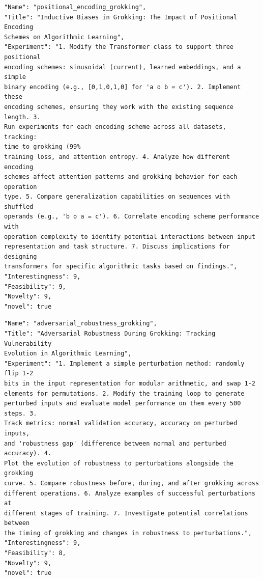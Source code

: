 \begin{tcolorbox}[breakable,colback=blue!5!white, colframe=blue!75!black, title=Idea 17/50 - \texttt{positional\_encoding\_grokking}]
\small
\begin{verbatim}
"Name": "positional_encoding_grokking",
"Title": "Inductive Biases in Grokking: The Impact of Positional Encoding
Schemes on Algorithmic Learning",
"Experiment": "1. Modify the Transformer class to support three positional
encoding schemes: sinusoidal (current), learned embeddings, and a simple
binary encoding (e.g., [0,1,0,1,0] for 'a o b = c'). 2. Implement these
encoding schemes, ensuring they work with the existing sequence length. 3.
Run experiments for each encoding scheme across all datasets, tracking:
time to grokking (99%
training loss, and attention entropy. 4. Analyze how different encoding
schemes affect attention patterns and grokking behavior for each operation
type. 5. Compare generalization capabilities on sequences with shuffled
operands (e.g., 'b o a = c'). 6. Correlate encoding scheme performance with
operation complexity to identify potential interactions between input
representation and task structure. 7. Discuss implications for designing
transformers for specific algorithmic tasks based on findings.",
"Interestingness": 9,
"Feasibility": 9,
"Novelty": 9,
"novel": true
\end{verbatim}
\end{tcolorbox}

\begin{tcolorbox}[breakable,colback=blue!5!white, colframe=blue!75!black, title=Idea 18/50 - \texttt{adversarial\_robustness\_grokking}]
\small
\begin{verbatim}
"Name": "adversarial_robustness_grokking",
"Title": "Adversarial Robustness During Grokking: Tracking Vulnerability
Evolution in Algorithmic Learning",
"Experiment": "1. Implement a simple perturbation method: randomly flip 1-2
bits in the input representation for modular arithmetic, and swap 1-2
elements for permutations. 2. Modify the training loop to generate
perturbed inputs and evaluate model performance on them every 500 steps. 3.
Track metrics: normal validation accuracy, accuracy on perturbed inputs,
and 'robustness gap' (difference between normal and perturbed accuracy). 4.
Plot the evolution of robustness to perturbations alongside the grokking
curve. 5. Compare robustness before, during, and after grokking across
different operations. 6. Analyze examples of successful perturbations at
different stages of training. 7. Investigate potential correlations between
the timing of grokking and changes in robustness to perturbations.",
"Interestingness": 9,
"Feasibility": 8,
"Novelty": 9,
"novel": true
\end{verbatim}
\end{tcolorbox}

